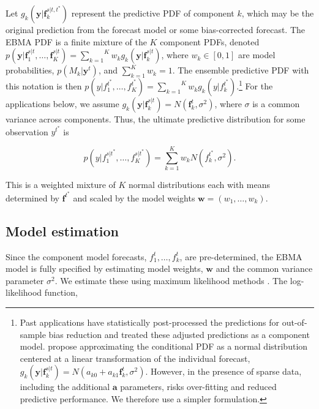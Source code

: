 \documentclass[12pt,fullpage,endnotes]{article}
\begin{document}
Let $g_k(\mathbf{y}|\mathbf{f}_k^{s|t, t^\ast})$ represent the
predictive PDF of component $k$, which may be the original prediction
from the forecast model or some bias-corrected forecast.  The EBMA PDF
is a finite mixture of the $K$ component PDFs, denoted
$p(\mathbf{y}|\mathbf{f}_1^{s|t}, \ldots,
\mathbf{f}_K^{s|t})=\overset{K}{\underset{k=1}{\sum}} w_k
g_k(\mathbf{y}|\mathbf{f}_k^{s|t})$, where $w_k \in [0,1]$ are model
probabilities, $p(M_k|\mathbf{y}^t)$, and $\sum_{k=1}^Kw_k=1$. The
ensemble predictive PDF with this notation is then
$p(y|f_{1}^{t^\ast}, \ldots,
f_{K}^{t^\ast})=\overset{K}{\underset{k=1}{\sum}} w_k
g_k(y|f_{k}^{t^*})$.\footnote{Past applications have statistically
  post-processed the predictions for out-of-sample bias reduction and
  treated these adjusted predictions as a component
  model. \citet{Raftery:2005} propose approximating the conditional
  PDF as a normal distribution centered at a linear transformation of
  the individual forecast, $g_k(\mathbf{y}|\mathbf{f}_k^{s|t}) =
  N(a_{k0} + a_{k1}\mathbf{f}_k^{t}, \sigma^2)$. However, in the
  presence of sparse data, including the additional $\mathbf{a}$
  parameters, risks over-fitting and reduced predictive performance.
  We therefore use a simpler formulation.}  For the applications
below, we assume $g_k(\mathbf{y}|\mathbf{f}_k^{s|t}) =
N(\mathbf{f}_k^{t}, \sigma^2)$, where $\sigma$ is a common variance
across components.  Thus, the ultimate predictive distribution for
some observation $y^{t^\ast}$ is

\begin{equation}
\label{pdf}p(y|f_1^{s|t^\ast},
\ldots, f_K^{s|t^\ast}) = \overset{K}{\underset{k=1}{\sum}} w_k
N(f_k^{t^\ast}, \sigma^2).
\end{equation}

\noindent This is a weighted mixture of $K$ normal distributions each with 
means  determined by $\mathbf{f}^{t^\ast}$ and scaled by the
model weights $\mathbf{w}=(w_1, \ldots, w_k)$.

\subsection{Model estimation}

Since the component model forecasts, $f^t_1, \ldots, f^t_k$, are
pre-determined, the EBMA model is fully specified by estimating model
weights, $\mathbf{w}$ and the common variance parameter
$\sigma^2$.  We estimate these using maximum likelihood methods
\citep{Raftery:2005}.  The log-likelihood function,
\end{document}
